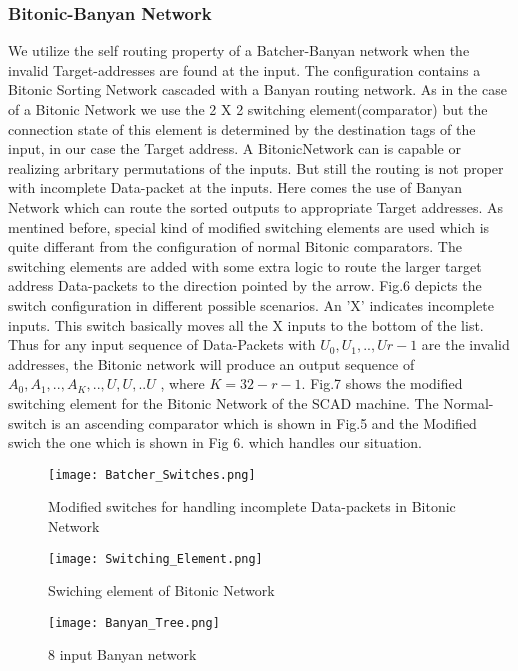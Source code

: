 				  \subsubsection{Bitonic-Banyan Network}
					      We utilize the self routing property of a Batcher-Banyan network \cite{batcher_banyan_ref} when the invalid Target-addresses are found at the input. The configuration contains
					      a Bitonic Sorting Network cascaded with a Banyan routing network. As in the case of a Bitonic Network we use the 2 X 2 switching element(comparator) but the connection state of this
					      element is determined by the destination tags of the input, in our case the Target address. A BitonicNetwork can is capable or realizing arbritary permutations of the inputs. 
					      But still the routing is not proper with incomplete Data-packet at the inputs. Here comes the use of Banyan Network which can route the sorted outputs to appropriate
					      Target addresses. As mentined before, special kind of modified switching elements are used which is quite differant from the configuration of normal Bitonic comparators.
					      The switching elements are added with some extra logic to route the larger target address Data-packets to the direction pointed by the arrow. 
					      Fig.6 depicts the switch configuration in different possible scenarios. An 'X' indicates incomplete inputs. This switch basically moves all the X inputs to the bottom of the list.
					      Thus for any input sequence of Data-Packets with $U_{0},U_{1},..,U{r-1}$  are the invalid addresses, the Bitonic network will produce an output sequence of $A_{0},A_{1},..,A_{K},..,U,U,..U$ , where
					      $ K = 32 - r -1$. Fig.7 shows the modified switching element for the Bitonic Network of the SCAD machine. The Normal-switch is an ascending comparator which is shown in Fig.5 and
					      the Modified swich the one which is shown in Fig 6.
					      which handles our situation.
						      \begin{figure}[!ht]
						      \texttt{[image: Batcher\_Switches.png]}
						      \caption{Modified switches for handling incomplete Data-packets in Bitonic Network}
					      \end{figure}
					      \begin{figure}[!ht]
						      \texttt{[image: Switching\_Element.png]}
						      \caption{Swiching element of Bitonic Network}
					      \end{figure}
					      \begin{figure}[!ht]
						      \texttt{[image: Banyan\_Tree.png]}
						      \caption{8 input Banyan network}
					      \end{figure}
